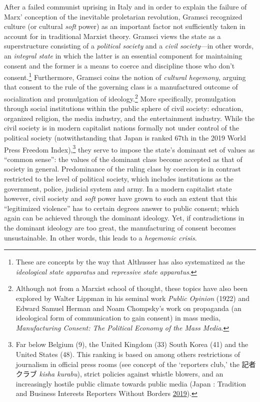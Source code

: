 \documentclass[10pt,british,A4paper,,openany]{memoir}
\begin{document}
After a failed communist uprising in Italy and in order to explain the
failure of Marx' conception of the inevitable proletarian revolution,
Gramsci recognized culture (or cultural \emph{soft} power) as an
important factor not sufficiently taken in account for in traditional
Marxist theory. Gramsci views the state as a superstructure consisting
of a \emph{political society} and a \emph{civil society}---in other
words, an \emph{integral state} in which the latter is an essential
component for maintaining consent and the former is a means to coerce
and discipline those who don't consent.\footnote{These are concepts by
  the way that Althusser has also systematized as the \emph{ideological
  state apparatus} and \emph{repressive state apparatus}.} Furthermore,
Gramsci coins the notion of \emph{cultural hegemony}, arguing that
consent to the rule of the governing class is a manufactured outcome of
socialization and promulgation of ideology.\footnote{Although not from a
  Marxist school of thought, these topics have also been explored by
  Walter Lippman in his seminal work \emph{Public Opinion} (1922) and
  Edward Samuel Herman and Noam Chompsky's work on propaganda (an
  ideological form of communication to gain consent) in mass media,
  \emph{Manufacturing Consent: The Political Economy of the Mass Media}.}
More specifically, promulgation through social institutions within the
public sphere of civil society: education, organized religion, the media
industry, and the entertainment industry. While the civil society is in
modern capitalist nations formally not under control of the political
society (notwithstanding that Japan is ranked 67th in the 2019 World
Press Freedom Index),\footnote{Far below Belgium (9), the United Kingdom
  (33) South Korea (41) and the United States (48). This ranking is
  based on among others restrictions of journalism in official press
  rooms (see concept of the `reporters club,' the 記者クラブ \emph{kisha
  kurabu}), strict policies against whistle blowers, and an increasingly
  hostile public climate towards public media (Japan : Tradition and
  Business Interests Reporters Without Borders
  \protect\hyperlink{ref-noauthor_japan_2019}{2019}).} they serve to
impose the state's dominant set of values as ``common sense'': the
values of the dominant class become accepted as that of society in
general. Predominance of the ruling class by coercion is in contrast
restricted to the level of political society, which includes
institutions as the government, police, judicial system and army. In a
modern capitalist state however, civil society and \emph{soft} power
have grown to such an extent that this ``legitimized violence'' has to
certain degrees answer to public consent; which again can be achieved
through the dominant ideology. Yet, if contradictions in the dominant
ideology are too great, the manufacturing of consent becomes
unsustainable. In other words, this leads to a \emph{hegemonic crisis}.
\end{document}
